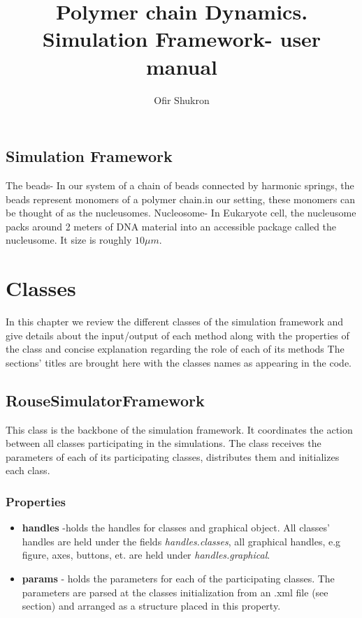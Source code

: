 \documentclass[12pt]{report}
\title{Polymer chain Dynamics. Simulation Framework- user manual}
\author{Ofir Shukron}
\begin{document}
\maketitle
\tableofcontents

\section{Simulation Framework}\label{secSimulatorFramework}
The beads- In our system of a chain of beads connected by harmonic springs, the beads represent monomers of a polymer chain.in our setting, these monomers can be thought of as the nucleusomes.
Nucleosome- In Eukaryote cell, the nucleusome packs around 2 meters of DNA material into an accessible package called the nucleusome. It size is roughly $10\mu m$.

\chapter{Classes}\label{classes}
In this chapter we review the different classes of the simulation framework and give details about the input/output of each method along with the properties of the class and concise explanation regarding the role of each of its methods
The sections' titles are brought here with the classes names as appearing in the code. 

\section{RouseSimulatorFramework}\label{secRouseSimulatorFramework}
This class is the backbone of the simulation framework. It coordinates the action between all classes participating in the simulations. The class receives the parameters of each of its participating classes, distributes them and initializes each class.

\subsection{Properties}
\begin{itemize}
\item{\textbf{handles}} -holds the handles for classes and graphical object. All classes' handles are held under the fields \textit{handles.classes}, all graphical handles, e.g figure, axes, buttons, et. are held under \textit{handles.graphical}. 
\item{\textbf{params}} - holds the parameters for each of the participating classes. The parameters are parsed at the classes initialization from an .xml file (see section) and arranged as a structure placed in this property.
\end{itemize}
\end{document}
